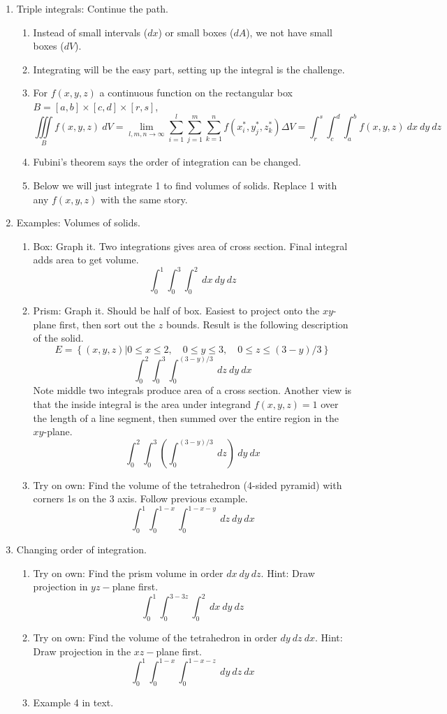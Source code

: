 \documentclass{article}
\begin{document}
\begin{enumerate}

\item Triple integrals: Continue the path.
\begin{enumerate}
\item Instead of small intervals ($dx$) or small boxes ($dA$), we not have small boxes ($dV$). 
\item Integrating will be the easy part, setting up the integral is the challenge.
\item For $f(x,y,z)$ a continuous function on the rectangular box $B=[a,b]\times[c,d]\times[r,s]$,
\[
\iiint\limits_B f(x,y,z) ~dV = \lim_{l,m,n \rightarrow \infty} \sum_{i=1}^l \sum_{j=1}^m \sum_{k=1}^n f(x_i^*,y_j^*,z_k^*) \Delta V = \int_r^s \int_c^d \int_a^b f(x,y,z) ~dx~dy~dz
\] 
\item Fubini's theorem says the order of integration can be changed.
\item Below we will just integrate 1 to find volumes of solids. Replace 1 with any $f(x,y,z)$ with the same story.
\end{enumerate}

\item Examples: Volumes of solids.
\begin{enumerate}
\item Box: Graph it. Two integrations gives area of cross section. Final integral adds area to get volume.
\[
 \int_0^1 \int_0^3 \int_0^2 ~dx~dy~dz
\]
\item Prism: Graph it. Should be half of box. Easiest to project onto the $xy$-plane first, then sort out the $z$ bounds. Result is the following description of the solid.
\[
E = \left\{(x,y,z) | 0 \leq x \leq 2, \quad 0 \leq y \leq 3, \quad 0 \leq z \leq (3-y)/3 \right\}
\]
\[
\int_0^2 \int_0^{3} \int_0^{(3-y)/3} ~dz~dy~dx
\]
Note middle two integrals produce area of a cross section. Another view is that the inside integral is the area under integrand $f(x,y,z)=1$ over the length of a line segment, then summed over the entire region in the $xy$-plane.
\[
\int_0^2 \int_0^{3} \left(\int_0^{(3-y)/3} ~dz \right)~dy~dx
\]
\item Try on own: Find the volume of the tetrahedron (4-sided pyramid) with corners 1s on the 3 axis. Follow previous example.
\[
\int_0^1 \int_0^{1-x} \int_0^{1-x-y} ~dz~dy~dx
\]
\end{enumerate}

\item Changing order of integration.
\begin{enumerate}
\item Try on own: Find the prism volume in order $dx ~dy ~dz$. Hint: Draw projection in $yz-$plane first.
\[
 \int_0^1 \int_0^{3-3z} \int_0^2 ~dx~dy~dz
\]
\item Try on own:  Find the volume of the tetrahedron in order $dy ~dz ~dx$. Hint: Draw projection in the $xz-$plane first.
\[
\int_0^1 \int_0^{1-x} \int_0^{1-x-z} ~dy~dz~dx
\]
\item Example 4 in text.
\end{enumerate}


\end{enumerate}
\end{document}
